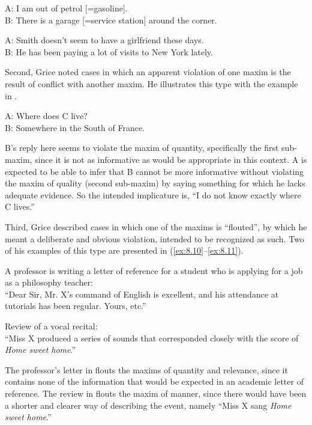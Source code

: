 \ea \label{ex:8.7}
A: I am out of petrol [=gasoline].\\
B: There is a garage [=service station] around the corner.
\z

\ea \label{ex:8.8}
A: Smith doesn’t seem to have a girlfriend these days.\\
B: He has been paying a lot of visits to New York lately.
\z


Second, Grice noted cases in which an apparent violation of one maxim is the result of conflict with another maxim. He illustrates this type with the example in . 


\ea \label{ex:8.9}
A: Where does C live?\\
B: Somewhere in the South of France.
\z


B’s reply here seems to violate the maxim of quantity, specifically the first sub-maxim, since it is not as informative as would be appropriate in this context. A is expected to be able to infer that B cannot be more informative without violating the maxim of quality (second sub-maxim) by saying something for which he lacks adequate evidence. So the intended implicature is, “I do not know exactly where C lives.”



Third, Grice described cases in which one of the maxims is “flouted”, by which he meant a deliberate and obvious violation, intended to be recognized as such. Two of his examples of this type are presented in (\ref{ex:8.10}--\ref{ex:8.11}).


\ea \label{ex:8.10}
A professor is writing a letter of reference for a student who is applying for a job as a philosophy teacher:\\
“Dear Sir, Mr. X’s command of English is excellent, and his attendance at tutorials has been regular. Yours, etc.”
\z

\ea \label{ex:8.11}
Review of a vocal recital:\\
“Miss X produced a series of sounds that corresponded closely with the score of \textit{Home sweet home}.”
\z


The professor’s letter in  flouts the maxims of quantity and relevance, since it contains none of the information that would be expected in an academic letter of reference. The review in  flouts the maxim of manner, since there would have been a shorter and clearer way of describing the event, namely “Miss X sang \textit{Home sweet home}.”



